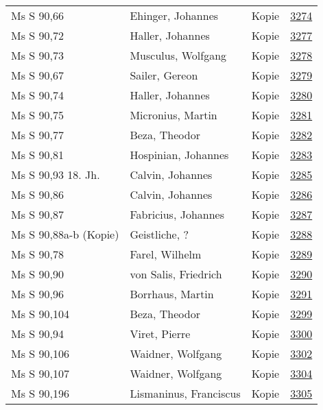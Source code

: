 \documentclass[10pt,a4paper,landscape]{report}
\begin{document}
\begin{longtable}{p{16cm}p{4cm}lr}
Ms S 90,66	&	Ehinger, Johannes	&	Kopie	&	\href{http://130.60.24.72/assignment/3274}{3274}\\
Ms S 90,72	&	Haller, Johannes	&	Kopie	&	\href{http://130.60.24.72/assignment/3277}{3277}\\
Ms S 90,73	&	Musculus, Wolfgang	&	Kopie	&	\href{http://130.60.24.72/assignment/3278}{3278}\\
Ms S 90,67	&	Sailer, Gereon	&	Kopie	&	\href{http://130.60.24.72/assignment/3279}{3279}\\
Ms S 90,74	&	Haller, Johannes	&	Kopie	&	\href{http://130.60.24.72/assignment/3280}{3280}\\
Ms S 90,75	&	Micronius, Martin	&	Kopie	&	\href{http://130.60.24.72/assignment/3281}{3281}\\
Ms S 90,77	&	Beza, Theodor	&	Kopie	&	\href{http://130.60.24.72/assignment/3282}{3282}\\
Ms S 90,81	&	Hospinian, Johannes	&	Kopie	&	\href{http://130.60.24.72/assignment/3283}{3283}\\
Ms S 90,93 18. Jh.	&	Calvin, Johannes	&	Kopie	&	\href{http://130.60.24.72/assignment/3285}{3285}\\
Ms S 90,86	&	Calvin, Johannes	&	Kopie	&	\href{http://130.60.24.72/assignment/3286}{3286}\\
Ms S 90,87	&	Fabricius, Johannes	&	Kopie	&	\href{http://130.60.24.72/assignment/3287}{3287}\\
Ms S 90,88a-b (Kopie)	&	Geistliche, ?	&	Kopie	&	\href{http://130.60.24.72/assignment/3288}{3288}\\
Ms S 90,78	&	Farel, Wilhelm	&	Kopie	&	\href{http://130.60.24.72/assignment/3289}{3289}\\
Ms S 90,90	&	von Salis, Friedrich	&	Kopie	&	\href{http://130.60.24.72/assignment/3290}{3290}\\
Ms S 90,96	&	Borrhaus, Martin	&	Kopie	&	\href{http://130.60.24.72/assignment/3291}{3291}\\
Ms S 90,104	&	Beza, Theodor	&	Kopie	&	\href{http://130.60.24.72/assignment/3299}{3299}\\
Ms S 90,94	&	Viret, Pierre	&	Kopie	&	\href{http://130.60.24.72/assignment/3300}{3300}\\
Ms S 90,106	&	Waidner, Wolfgang	&	Kopie	&	\href{http://130.60.24.72/assignment/3302}{3302}\\
Ms S 90,107	&	Waidner, Wolfgang	&	Kopie	&	\href{http://130.60.24.72/assignment/3304}{3304}\\
Ms S 90,196	&	Lismaninus, Franciscus	&	Kopie	&	\href{http://130.60.24.72/assignment/3305}{3305}\\

\end{longtable}
\end{document}
